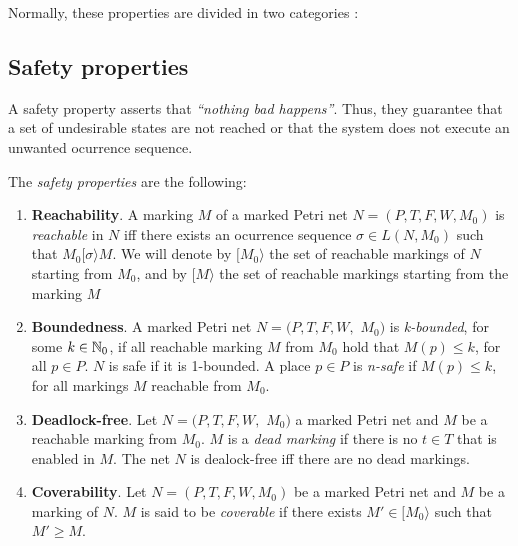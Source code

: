 \medskip
Normally, these properties are divided in two categories \cite{citar}:

\subsection{Safety properties}
A safety property asserts that \emph{``nothing bad happens''}.
Thus, they guarantee that a set of undesirable states are not reached or that
the system does not execute an unwanted ocurrence sequence.

The \emph{safety properties} are the following:

\begin{enumerate}
\item {\bf Reachability}. A marking $M$ of a marked Petri net
$N= (P,T,F,W,M_0)$ is {\it reachable} in $N$
iff there exists an ocurrence sequence $\sigma \in L(N,M_0)$
such that $M_0 [ \sigma \rangle M$. We will denote by $[M_0\rangle$ the
set of reachable markings of $N$ starting from $M_0$, and
by $[ M \rangle$ the set of reachable markings starting from the marking $M$

\item {\bf Boundedness}. A marked Petri net $N=(P,T,F,W,$ \linebreak
$M_0)$ is {\it k-bounded}, for some $k \in \mathbb{N}_{0}$, if all reachable marking
$M$ from $M_0$ hold that $M(p) \leq k$, for all $p \in P$. $N$ is safe if
it is 1-bounded. A place $p \in P$ is
{\it n-safe} if $M(p) \leq k$, for all markings $M$ reachable from $M_0$.

\item {\bf Deadlock-free}. Let $N=(P,T,F,W,$ \linebreak
$M_0)$ a marked Petri net and $M$ be a reachable marking from $M_0$.
$M$ is a {\it dead marking} if there is no $t \in T$ that is enabled in $M$. 
The net $N$ is dealock-free iff there are no dead markings.

\item {\bf Coverability}.
Let $N=(P,T,F,W,M_0)$ be a marked Petri net and $M$ be a marking of $N$.
$M$ is said to be {\it coverable} if there exists $M' \in
[M_0 \rangle$ such that $M' \geq M$.
\end{enumerate}

